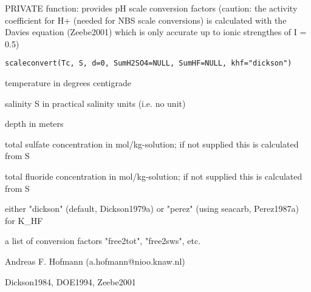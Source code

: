 \documentclass{article}
\begin{document}
\begin{Description}\relax
PRIVATE function: provides pH scale conversion factors (caution: the activity coefficient for H+ (needed for NBS scale conversions) is calculated with the Davies equation (Zeebe2001) which is only accurate up to ionic strengthes of I = 0.5)
\end{Description}
\begin{Usage}
\begin{verbatim}scaleconvert(Tc, S, d=0, SumH2SO4=NULL, SumHF=NULL, khf="dickson")\end{verbatim}
\end{Usage}
\begin{Arguments}
\begin{ldescription}
\item[\code{Tc }] temperature in degrees centigrade
\item[\code{S }] salinity S in practical salinity units (i.e. no unit)
\item[\code{d }] depth in meters
\item[\code{SumH2SO4 }] total sulfate concentration in mol/kg-solution; if not supplied this is calculated from S
\item[\code{SumHF }] total fluoride concentration in mol/kg-solution; if not
supplied this is calculated from S
\item[\code{khf}] either "dickson" (default, Dickson1979a) or "perez" (using seacarb, Perez1987a) for K\_HF
\end{ldescription}
\end{Arguments}
\begin{Value}
a list of conversion factors "free2tot", "free2sws", etc.
\end{Value}
\begin{Author}\relax
Andreas F. Hofmann (a.hofmann@nioo.knaw.nl)
\end{Author}
\begin{References}\relax
Dickson1984, DOE1994, Zeebe2001
\end{References}
\end{document}
